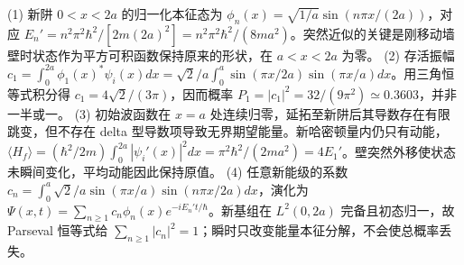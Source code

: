(1) 新阱 \(0<x<2a\) 的归一化本征态为 \(\phi_n(x)=\sqrt{1/a}\sin(n\pi x/(2a))\)，对应 \(E_n'=n^2\pi^2\hbar^2/[2m(2a)^2]=n^2\pi^2\hbar^2/(8ma^2)\)。突然近似的关键是刚移动墙壁时状态作为平方可积函数保持原来的形状，在 \(a<x<2a\) 为零。
(2) 存活振幅 \(c_1=\int_0^{2a}\phi_1(x)^*\psi_i(x)dx=\sqrt2/a\int_0^a\sin(\pi x/2a)\sin(\pi x/a)dx\)。用三角恒等式积分得 \(c_1=4\sqrt2/(3\pi)\)，因而概率 \(P_1=|c_1|^2=32/(9\pi^2)\simeq0.3603\)，并非一半或一。
(3) 初始波函数在 \(x=a\) 处连续归零，延拓至新阱后其导数存在有限跳变，但不存在 delta 型导数项导致无界期望能量。新哈密顿量内仍只有动能，\(\langle H_f\rangle=(\hbar^2/2m)\int_0^{2a}|\psi_i'(x)|^2dx=\pi^2\hbar^2/(2ma^2)=4E_1'\)。壁突然外移使状态未瞬间变化，平均动能因此保持原值。
(4) 任意新能级的系数 \(c_n=\int_0^a\sqrt{2}/a\sin(\pi x/a)\sin(n\pi x/2a)dx\)，演化为 \(\Psi(x,t)=\sum_{n\ge1}c_n\phi_n(x)e^{-iE_n't/\hbar}\)。新基组在 \(L^2(0,2a)\) 完备且初态归一，故 Parseval 恒等式给 \(\sum_{n\ge1}|c_n|^2=1\)；瞬时只改变能量本征分解，不会使总概率丢失。
